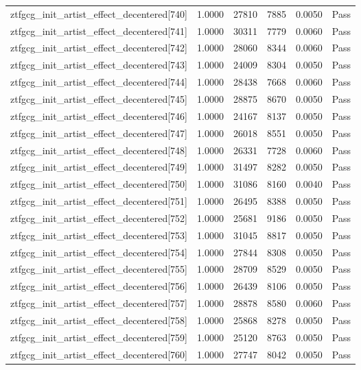 \begin{table}[htbp]
\begin{tabular}{llrrll}
ztfgcg\_init\_artist\_effect\_decentered[740] & 1.0000 & 27810 & 7885 & 0.0050 & Pass \\
ztfgcg\_init\_artist\_effect\_decentered[741] & 1.0000 & 30311 & 7779 & 0.0060 & Pass \\
ztfgcg\_init\_artist\_effect\_decentered[742] & 1.0000 & 28060 & 8344 & 0.0060 & Pass \\
ztfgcg\_init\_artist\_effect\_decentered[743] & 1.0000 & 24009 & 8304 & 0.0050 & Pass \\
ztfgcg\_init\_artist\_effect\_decentered[744] & 1.0000 & 28438 & 7668 & 0.0060 & Pass \\
ztfgcg\_init\_artist\_effect\_decentered[745] & 1.0000 & 28875 & 8670 & 0.0050 & Pass \\
ztfgcg\_init\_artist\_effect\_decentered[746] & 1.0000 & 24167 & 8137 & 0.0050 & Pass \\
ztfgcg\_init\_artist\_effect\_decentered[747] & 1.0000 & 26018 & 8551 & 0.0050 & Pass \\
ztfgcg\_init\_artist\_effect\_decentered[748] & 1.0000 & 26331 & 7728 & 0.0060 & Pass \\
ztfgcg\_init\_artist\_effect\_decentered[749] & 1.0000 & 31497 & 8282 & 0.0050 & Pass \\
ztfgcg\_init\_artist\_effect\_decentered[750] & 1.0000 & 31086 & 8160 & 0.0040 & Pass \\
ztfgcg\_init\_artist\_effect\_decentered[751] & 1.0000 & 26495 & 8388 & 0.0050 & Pass \\
ztfgcg\_init\_artist\_effect\_decentered[752] & 1.0000 & 25681 & 9186 & 0.0050 & Pass \\
ztfgcg\_init\_artist\_effect\_decentered[753] & 1.0000 & 31045 & 8817 & 0.0050 & Pass \\
ztfgcg\_init\_artist\_effect\_decentered[754] & 1.0000 & 27844 & 8308 & 0.0050 & Pass \\
ztfgcg\_init\_artist\_effect\_decentered[755] & 1.0000 & 28709 & 8529 & 0.0050 & Pass \\
ztfgcg\_init\_artist\_effect\_decentered[756] & 1.0000 & 26439 & 8106 & 0.0050 & Pass \\
ztfgcg\_init\_artist\_effect\_decentered[757] & 1.0000 & 28878 & 8580 & 0.0060 & Pass \\
ztfgcg\_init\_artist\_effect\_decentered[758] & 1.0000 & 25868 & 8278 & 0.0050 & Pass \\
ztfgcg\_init\_artist\_effect\_decentered[759] & 1.0000 & 25120 & 8763 & 0.0050 & Pass \\
ztfgcg\_init\_artist\_effect\_decentered[760] & 1.0000 & 27747 & 8042 & 0.0050 & Pass \\

\end{tabular}
\end{table}
